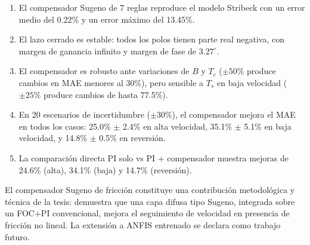 \begin{enumerate}
  \item El compensador Sugeno de 7 reglas reproduce el modelo Stribeck con un error medio del 0.22\% y un error máximo del 13.45\%.
  
  \item El lazo cerrado es estable: todos los polos tienen parte real negativa, con margen de ganancia infinito y margen de fase de $3.27^\circ$.
  
  \item El compensador es robusto ante variaciones de $B$ y $T_c$ ($\pm 50\%$ produce cambios en MAE menores al 30\%), pero sensible a $T_s$ en baja velocidad ($\pm 25\%$ produce cambios de hasta 77.5\%).
  
  \item En 20 escenarios de incertidumbre ($\pm 30\%$), el compensador mejora el MAE en todos los casos: 25.0\% $\pm$ 2.4\% en alta velocidad, 35.1\% $\pm$ 5.1\% en baja velocidad, y 14.8\% $\pm$ 0.5\% en reversión.
  
  \item La comparación directa PI solo vs PI + compensador muestra mejoras de 24.6\% (alta), 34.1\% (baja) y 14.7\% (reversión).
\end{enumerate}

El compensador Sugeno de fricción constituye una contribución metodológica y técnica de la tesis: demuestra que una capa difusa tipo Sugeno, integrada sobre un FOC+PI convencional, mejora el seguimiento de velocidad en presencia de fricción no lineal. La extensión a ANFIS entrenado se declara como trabajo futuro.
